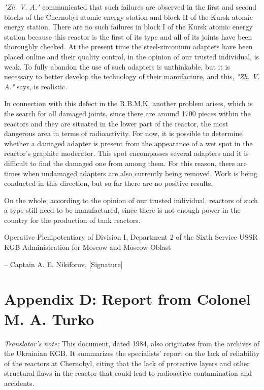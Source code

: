 \documentclass[openright]{bookest}
\begin{document}
\textit{"Zh. V. A."} communicated that such failures are observed in the first and second blocks of the Chernobyl atomic energy station and block II of the Kursk atomic energy station. There are no such failures in block I of the Kursk atomic energy station because this reactor is the first of its type and all of its joints have been thoroughly checked. At the present time the steel-zirconium adapters have been placed online and their quality control, in the opinion of our trusted individual, is weak. To fully abandon the use of such adapters is unthinkable, but it is necessary to better develop the technology of their manufacture, and this, \textit{"Zh. V. A."} says, is realistic.

In connection with this defect in the R.B.M.K. another problem arises, which is the search for all damaged joints, since there are around \num{1700} pieces within the reactors and they are situated in the lower part of the reactor, the most dangerous area in terms of radioactivity. For now, it is possible to determine whether a damaged adapter is present from the appearance of a wet spot in the reactor's graphite moderator. This spot encompasses several adapters and it is difficult to find the damaged one from among them. For this reason, there are times when undamaged adapters are also currently being removed. Work is being conducted in this direction, but so far there are no positive results.

On the whole, according to the opinion of our trusted individual, reactors of such a type still need to be manufactured, since there is not enough power in the country for the production of tank reactors.

Operative Plenipotentiary of Division I, Department 2 of the Sixth Service USSR KGB Administration for Moscow and Moscow Oblast

\begin{flushright}\small{
-- Captain A. E. Nikiforov, [Signature]
}\end{flushright}

\chapter*{Appendix D: Report from Colonel M. A. Turko}

\textit{Translator's note:} This document, dated 1984, also originates from the archives of the Ukrainian KGB. It summarizes the specialists' report on the lack of reliability of the reactors at Chernobyl, citing that the lack of protective layers and other structural flaws in the reactor that could lead to radioactive contamination and accidents.
\end{document}
